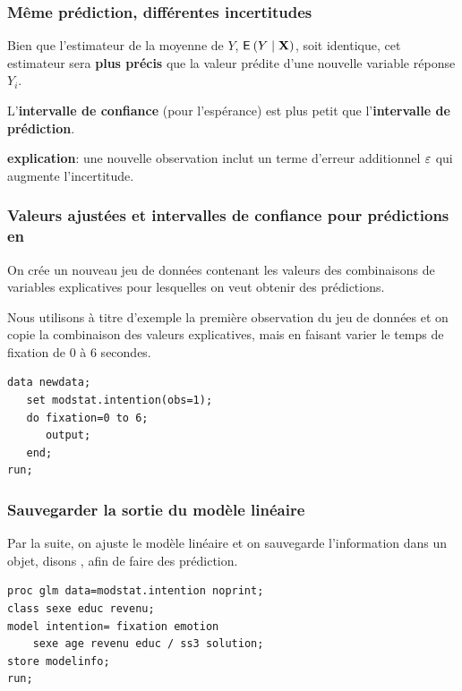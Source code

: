 \documentclass[xcolor={dvipsnames}]{beamer}
\begin{document}
\begin{frame}
\frametitle{Même prédiction, différentes incertitudes}
\bi \item
 Bien que l'estimateur de la moyenne de $Y$, ${\mathsf E}_{}\left(Y \mid \mathbf{X}\right)$, soit identique, cet estimateur sera \alert{\textbf{plus précis}} que la valeur prédite d'une nouvelle variable réponse $Y_i$.
\item L'\textbf{intervalle de confiance} (pour l'espérance) est plus petit que l'\textbf{intervalle de prédiction}.
\bi \item \textbf{explication}: une nouvelle observation inclut un terme d'erreur additionnel $\varepsilon$ qui augmente l'incertitude.
\ei
 \ei
\end{frame}

\begin{frame}[fragile]
\frametitle{Valeurs ajustées et intervalles de confiance pour prédictions en \SASlang}
\bi
\item On crée un nouveau jeu de données  contenant les valeurs des combinaisons de variables explicatives pour lesquelles on veut obtenir des prédictions. 
\item Nous utilisons à titre d'exemple la première observation du jeu de données et on copie la combinaison des valeurs explicatives, mais en faisant varier le temps de fixation de $0$ à $6$ secondes.
\ei
\begin{tcolorbox}[colback=white, colframe=hecblue, title=Code \SASlang pour créer un nouveau jeu de données]
\begin{verbatim}
data newdata;
   set modstat.intention(obs=1);
   do fixation=0 to 6;
      output;
   end;
run;
\end{verbatim}
\end{tcolorbox}
\end{frame}

\begin{frame}[fragile]
\frametitle{Sauvegarder la sortie du modèle linéaire}
\bi
\item Par la suite, on ajuste le modèle linéaire et on sauvegarde l'information dans un objet, disons , afin de faire des prédiction.
\ei
\begin{tcolorbox}[colback=white, colframe=hecblue, title=Code \SASlang pour enregistrer la sortie du modèle linéaire]
\begin{verbatim}
proc glm data=modstat.intention noprint;
class sexe educ revenu;
model intention= fixation emotion 
    sexe age revenu educ / ss3 solution;
store modelinfo; 
run;
\end{verbatim}
\end{tcolorbox}
\end{frame}
\end{document}
